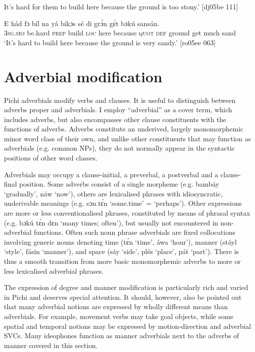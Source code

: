 \glt It’s hard for them to build here because the ground is too stony.’ [dj05be 111]
\z


\ea%
    \label{ex:key:839}
    \gll E    hád    fɔ  bíl    na  yá    bikɔs  sé    di  grɔ́n
gɛ́t  bɔkú  sansán.\\
\textsc{3sg.sbj}  be.hard  \textsc{prep}  build  \textsc{loc}  here    because  \textsc{quot}    \textsc{def}  ground
get  much  sand\\
\glt ‘It’s hard to build here because the ground is very sandy.’ [ro05ee 063]
\z

\section{Adverbial modification}\label{sec:7.7}

Pichi adverbials modify verbs and clauses. It is useful to distinguish between adverbs proper and adverbials. I employ “adverbial” as a cover term, which includes adverbs, but also encompasses other clause constituents with the functions of adverbs. Adverbs constitute an underived, largely monomorphemic minor word class of their own, and unlike other constituents that may function as adverbials (e.g. common NPs), they do not normally appear in the syntactic positions of other word classes. 


Adverbials may occupy a clause-initial, a preverbal, a postverbal and a clause-final position. Some adverbs consist of a single morpheme (e.g. bambáy ‘gradually’, náw ‘now’), others are lexicalised phrases with idiosyncratic, underivable meanings (e.g. sɔn.tɛ́n ‘some.time’ = ‘perhaps’). Other expressions are more or less conventionalised phrases, constituted by means of phrasal syntax (e.g. bɔkú tɛ́n dɛn ‘many times; often’), but usually not encountered in non-adverbial functions. Often such noun phrase adverbials are fixed collocations involving generic nouns denoting time (tɛ́n ‘time’, áwa ‘hour’), manner (stáyl ‘style’, fásin ‘manner’), and space (sáy ‘side’, plés ‘place’, pát ‘part’). There is thus a smooth transition from more basic monomorphemic adverbs to more or less lexicalised adverbial phrases. 



The expression of degree and manner modification is particularly rich and varied in Pichi and deserves special attention. It should, however, also be pointed out that many adverbial notions are expressed by wholly different means than adverbials. For example, movement verbs may take goal objects, while some spatial and temporal notions may be expressed by motion-direction and adverbial SVCs. Many ideophones function as manner adverbials next to the adverbs of manner covered in this section. 



